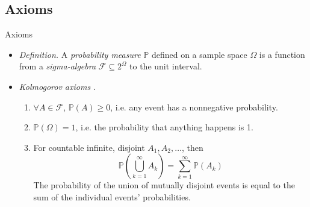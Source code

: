 \documentclass{beamer}
\begin{document}
\subsection{Axioms}

\begin{frame}{Axioms}
    \begin{itemize}
        \item
        \textit{Definition.} A \textit{probability measure} $ \mathbb{P} $
        defined on a sample space $ \Omega $ is a function from a
        \textit{sigma-algebra} $ \mathcal{F} \subseteq 2^\Omega $ to the unit
        interval.

        \item
        \textit{Kolmogorov axioms} \cite{all_of_stats}.
        \begin{enumerate}
            \item
            $ \forall A \in \mathcal{F} $, $ \mathbb{P}(A) \ge 0 $, i.e. any
            event has a nonnegative probability.

            \item
            $ \mathbb{P}(\Omega) = 1 $, i.e. the probability that anything
            happens is 1.

            \item
            For countable infinite, disjoint $ A_1, A_2, \ldots $, then
            \begin{equation*}
                \mathbb{P}\left(\bigcup_{k = 1}^\infty A_k\right) =
                \sum_{k = 1}^\infty\mathbb{P}(A_k)
            \end{equation*}
            The probability of the union of mutually disjoint events is equal
            to the sum of the individual events' probabilities.
        \end{enumerate}
    \end{itemize}
\end{frame}
\end{document}
